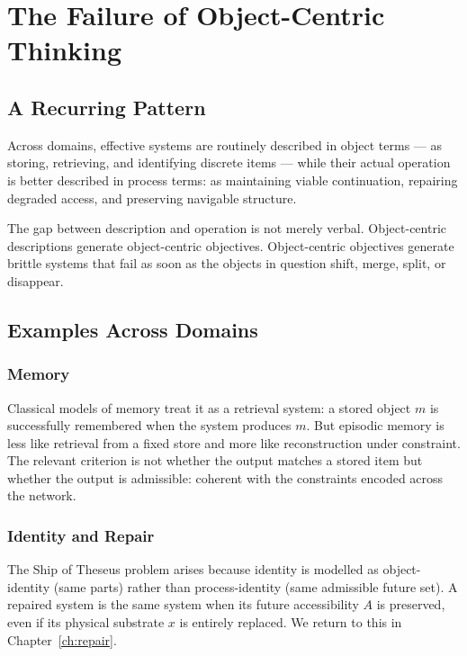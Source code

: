 \documentclass[11pt, a4paper, openany]{book}
\theoremstyle{plain}
\theoremstyle{definition}
\theoremstyle{remark}
\begin{document}
\chapter{The Failure of Object-Centric Thinking}
\label{ch:object}

\section{A Recurring Pattern}

Across domains, effective systems are routinely described in object terms
--- as storing, retrieving, and identifying discrete items --- while their
actual operation is better described in process terms: as maintaining viable
continuation, repairing degraded access, and preserving navigable structure.

The gap between description and operation is not merely verbal.
Object-centric descriptions generate object-centric objectives.
Object-centric objectives generate brittle systems that fail as soon as
the objects in question shift, merge, split, or disappear.

\section{Examples Across Domains}

\subsection{Memory}

Classical models of memory treat it as a retrieval system:
a stored object $m$ is successfully remembered when the system produces $m$.
But episodic memory is less like retrieval from a fixed store and more like
reconstruction under constraint.
The relevant criterion is not whether the output matches a stored item
but whether the output is admissible: coherent with the constraints
encoded across the network.

\subsection{Identity and Repair}

The Ship of Theseus problem arises because identity is modelled as
object-identity (same parts) rather than process-identity (same admissible future set).
A repaired system is the same system when its future accessibility $A$
is preserved, even if its physical substrate $x$ is entirely replaced.
We return to this in Chapter~\ref{ch:repair}.
\end{document}
